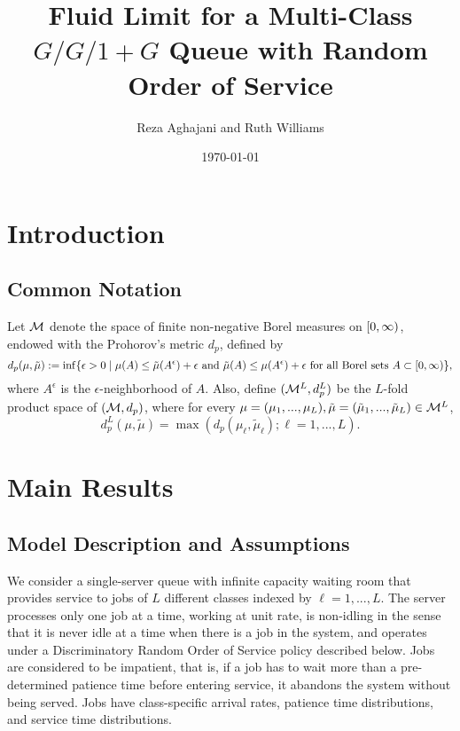 \documentclass{article}
\theoremstyle{definition}
\numberwithin{equation}{section}
\begin{document}
\title{Fluid Limit for a Multi-Class $G/G/1+G$ Queue with Random Order of Service}
\date{\today}
\author{Reza Aghajani and Ruth Williams}

\maketitle

\tableofcontents


\section{Introduction}\label{sec_intro}

\subsection{Common Notation} \label{sec_notation}

Let $\mathcal{M}$ denote the space of finite non-negative Borel measures on $[0,\infty)$, endowed with the Prohorov's metric $d_p$, defined by
\[
d_p(\mu,\tilde\mu) := \inf\{ \epsilon>0 \; | \; \mu(A)\leq \tilde\mu(A^\epsilon)+\epsilon\text{ and }\tilde\mu(A)\leq \mu(A^\epsilon)+\epsilon\text{ for all Borel sets } A\subset[0,\infty)\},
\]
where $A^\epsilon$ is the $\epsilon$-neighborhood of $A$. Also, define $(\mathcal{M}^L,d_p^L)$ be the $L$-fold product space of $(\mathcal{M},d_p)$, where for every $\mu=(\mu_1,...,\mu_L),\tilde\mu=(\tilde\mu_1,...,\tilde\mu_L)\in\mathcal{M}^L$,
\[
d_p^L(\mu,\tilde\mu)=\max(d_p(\mu_\ell,\tilde\mu_\ell);\ell=1,...,L).
\]

\section{Main Results}


\subsection{Model Description and Assumptions}\label{sec_model}
We consider a single-server queue with infinite capacity waiting room that provides service to jobs of $L$ different classes indexed by $\ell=1,...,L$. The server processes only one job at a time, working at unit rate, is non-idling in the sense that it is never idle at a time when there is a job in the system, and operates under a Discriminatory Random Order of Service policy described below. Jobs are considered to be impatient, that is, if a job has to wait more than a pre-determined patience time before entering service, it abandons the system without being served. Jobs have class-specific arrival rates, patience time distributions, and service time distributions.
\end{document}

